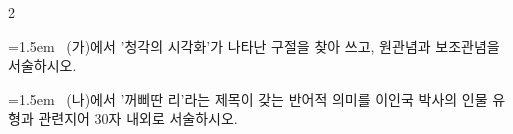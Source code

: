 \documentclass[10pt, a4paper]{article}
\begin{document}
\begin{multicols}{2}
\noindent\begin{minipage}{\columnwidth}
\vspace{2mm}
{\hangindent=1.5em  ~(가)에서 '청각의 시각화'가 나타난 구절을 찾아 쓰고, 원관념과 보조관념을 서술하시오.\par}

\vspace{3mm}
\noindent\hrulefill
\vspace{2.5mm}
\noindent\hrulefill
\vspace{2.5mm}
\noindent\hrulefill
\vspace{2.5mm}
\noindent\hrulefill
\vspace{2.5mm}
\noindent\hrulefill
\vspace{2.5mm}
\vspace{1mm}
\vspace{4mm}
\end{minipage}
\par

\noindent\begin{minipage}{\columnwidth}
\vspace{2mm}
{\hangindent=1.5em  ~(나)에서 '꺼삐딴 리'라는 제목이 갖는 반어적 의미를 이인국 박사의 인물 유형과 관련지어 30자 내외로 서술하시오.\par}

\vspace{3mm}
\noindent\hrulefill
\vspace{2.5mm}
\noindent\hrulefill
\vspace{2.5mm}
\noindent\hrulefill
\vspace{2.5mm}
\noindent\hrulefill
\vspace{2.5mm}
\noindent\hrulefill
\vspace{2.5mm}
\vspace{1mm}
\vspace{4mm}
\end{minipage}
\par


\vspace{1mm}
\vspace{0.5mm}


\end{multicols}
\end{document}
